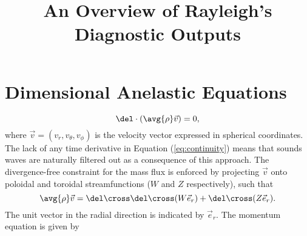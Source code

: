 \documentclass[12pt,letterpaper]{article}
\begin{document}
\title{An Overview of Rayleigh's Diagnostic Outputs}
\date{}
\maketitle

\section{Dimensional Anelastic Equations}
\begin{equation}  %
  \label{eq:continuity}
  \del \cdot(\avg{\rho}\vec{v}) = 0,
\end{equation}
where $\vec{v} = (v_r,v_{\theta},v_{\phi})$ is the velocity vector expressed in spherical coordinates.  The lack of any time derivative in Equation (\ref{eq:continuity}) means that sounds waves are naturally filtered out as a consequence of this approach.  The divergence-free constraint for the mass flux is enforced by projecting $\vec{v}$ onto poloidal and toroidal streamfunctions ($W$ and $Z$ respectively), such that
\begin{equation}  %
	\avg{\rho}\vec{v} = \del\cross\del\cross(W\vec{e}_r)+\del\cross(Z\vec{e}_r).
\end{equation}
The unit vector in the radial direction is indicated by $\vec{e}_r$.  The momentum equation is given by
\end{document}

